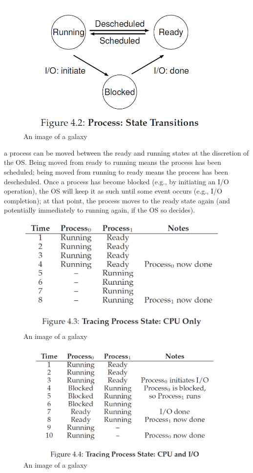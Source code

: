 \documentclass{article}
\begin{document}
\begin{figure}[H]
    \centering
    \includegraphics[width=13cm]  {fig4.2.png}
    \caption{An image of a galaxy}
    \label{fig:galaxy}
\end{figure}
a process can be moved between the ready and running states at the discretion of the OS. Being moved from ready to running means the process has been scheduled; being moved from running to ready means the process has been descheduled. Once a process has become blocked (e.g., by initiating an I/O operation), the OS will keep it as such until some event occurs (e.g., I/O completion); at that point, the process moves to the ready state again
(and potentially immediately to running again, if the OS so decides).
\begin{figure}[H]
    \centering
    \includegraphics[width=13cm] {fig4.3.png}
    \caption{An image of a galaxy}
    \label{fig:galaxy}
\end{figure}

\begin{figure}[H]
    \centering
    \includegraphics[width=13cm] {fig4.4.png}
    \caption{An image of a galaxy}
    \label{fig:galaxy}
\end{figure}
\end{document}
